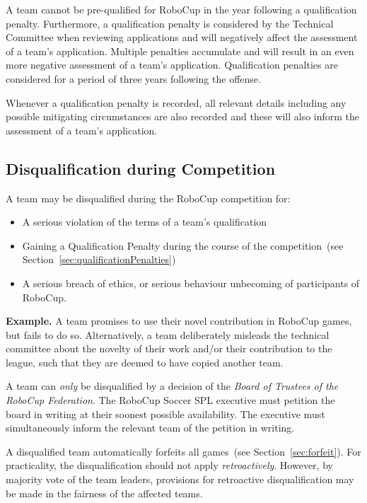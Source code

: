 \documentclass[12pt]{article}
\newcommand{\cf}{see\xspace}
\begin{document}
A team cannot be pre-qualified for RoboCup in the year following a qualification penalty. Furthermore, a qualification penalty is considered by the Technical Committee when reviewing applications and will negatively affect the assessment of a team's application. Multiple penalties accumulate and will result in an even more negative assessment of a team's application. Qualification penalties are considered for a period of three years following the offense.

Whenever a qualification penalty is recorded, all relevant details including any possible mitigating circumstances are also recorded and these will also inform the assessment of a team's application.

\subsection{Disqualification during Competition}
\label{sec:disqualification_during_comp}

A team may be disqualified during the RoboCup competition for:
\begin{itemize}
  \item A serious violation of the terms of a team's qualification
  \item Gaining a Qualification Penalty during the course of the competition~(\cf Section~\ref{sec:qualificationPenalties})
  \item A serious breach of ethics, or serious behaviour unbecoming of participants of RoboCup.
\end{itemize}

\textbf{Example.} A team promises to use their novel contribution in RoboCup games, but fails to do so.
Alternatively, a team deliberately misleads the technical committee about the novelty of their work and/or their contribution to the league, such that they are deemed to have copied another team.

A team can \textit{only} be disqualified by a decision of the \textit{Board of Trustees of the RoboCup Federation}.
The RoboCup Soccer SPL executive must petition the board in writing at their soonest possible availability.
The executive must simultaneously inform the relevant team of the petition in writing.

A disqualified team automatically forfeits all games~(\cf Section~\ref{sec:forfeit}).
For practicality, the disqualification should not apply \textit{retroactively}.
However, by majority vote of the team leaders, provisions for retroactive disqualification may be made in the fairness of the affected teams.
\end{document}
